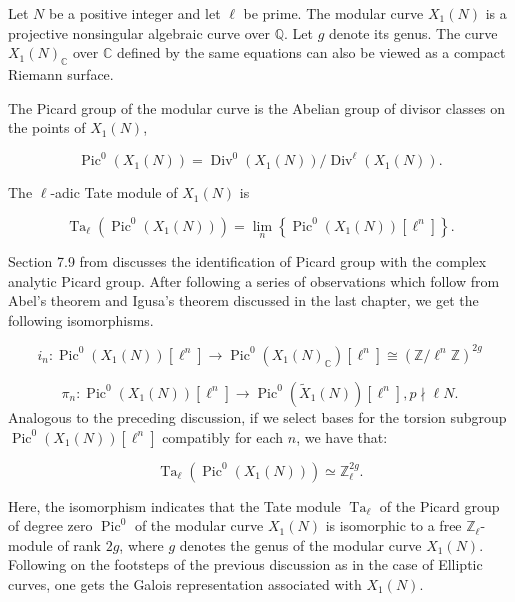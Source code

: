 Let $N$ be a positive integer and let $\ell$ be prime. The modular curve $X_{1}(N)$ is a projective nonsingular algebraic curve over $\mathbb{Q}$. Let $g$ denote its genus. The curve $X_{1}(N)_{\mathbb{C}}$ over $\mathbb{C}$ defined by the same equations can also be viewed as a compact Riemann surface.
\begin{definition}
    The Picard group of the modular curve is the Abelian group of divisor classes on the points of $X_{1}(N)$,

$$
\operatorname{Pic}^{0}\left(X_{1}(N)\right)=\operatorname{Div}^{0}\left(X_{1}(N)\right) / \operatorname{Div}^{\ell}\left(X_{1}(N)\right) .
$$

\end{definition}
\begin{definition}
    The $\ell$-adic Tate module of $X_{1}(N)$ is

$$
\operatorname{Ta}_{\ell}\left(\operatorname{Pic}^{0}\left(X_{1}(N)\right)\right)={\lim _{n}}\left\{\operatorname{Pic}^{0}\left(X_{1}(N)\right)\left[\ell^{n}\right]\right\} .
$$

\end{definition}
Section 7.9 from \cite{diamond2005first} discusses the identification of Picard group with the complex analytic Picard group. After following a series of observations which follow from Abel's theorem and Igusa's theorem discussed in the last chapter, we get the following isomorphisms. 

$$
i_{n}: \operatorname{Pic}^{0}\left(X_{1}(N)\right)\left[\ell^{n}\right] \longrightarrow \operatorname{Pic}^{0}\left(X_{1}(N)_{\mathbb{C}}\right)\left[\ell^{n}\right] \cong\left(\mathbb{Z} / \ell^{n} \mathbb{Z}\right)^{2 g}
$$

$$
\pi_{n}: \operatorname{Pic}^{0}\left(X_{1}(N)\right)\left[\ell^{n}\right] \longrightarrow \operatorname{Pic}^{0}\left(\widetilde{X}_{1}(N)\right)\left[\ell^{n}\right] , p \nmid \ell N .
$$
Analogous to the preceding discussion, if we  select bases for the torsion subgroup \( \operatorname{Pic}^{0}(X_{1}(N))[\ell^{n}] \) compatibly for each \( n \), we have that:

\[
\operatorname{Ta}_{\ell}(\operatorname{Pic}^{0}(X_{1}(N))) \simeq \mathbb{Z}_{\ell}^{2g}.
\]

Here, the isomorphism indicates that the Tate module \( \operatorname{Ta}_{\ell} \) of the Picard group of degree zero \( \operatorname{Pic}^{0} \) of the modular curve \( X_{1}(N) \) is isomorphic to a free \( \mathbb{Z}_{\ell} \)-module of rank \( 2g \), where \( g \) denotes the genus of the modular curve \( X_{1}(N) \). 
Following on the footsteps of the previous discussion as in the case of Elliptic curves, one gets the Galois representation associated with $X_1(N)$. 


